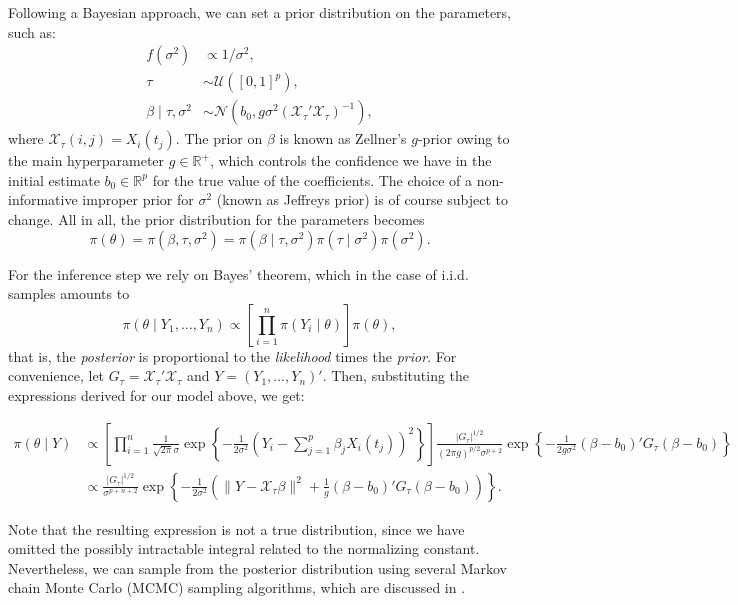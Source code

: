 \documentclass[
  a4paper,
	fontsize=11pt, %
	twoside=false, %
  secnumdepth=2,
	numbers=noenddot, %
]{kaohandt}
\newcommand{\R} {\ensuremath{\mathds{R}}}
\begin{document}
Following a Bayesian approach, we can set a prior distribution on the parameters, such as:
\begin{align*}
  f(\sigma^2)              & \propto 1/\sigma^2,                                                     \\
  \tau                     & \sim \mathscr U([0, 1]^p),                                              \\
  \beta\mid \tau, \sigma^2 & \sim \mathcal N(b_0, g\sigma^2(\mathcal X_\tau' \mathcal X_\tau)^{-1}),
\end{align*}
where
\(\mathcal X_\tau(i, j)=X_i(t_j)\). The prior on \(\beta\) is known as Zellner's \(g\)-prior owing to the main hyperparameter \(g\in \R^+\), which controls the confidence we have in the initial estimate \(b_0 \in \R^p\) for the true value of the coefficients. The choice of a non-informative improper prior for \(\sigma^2\) (known as Jeffreys prior) is of course subject to change. All in all, the prior distribution for the parameters becomes
\begin{equation}
  \label{eq:prior}
  \pi(\theta) = \pi(\beta, \tau, \sigma^2) = \pi(\beta \mid \tau, \sigma^2)\pi(\tau \mid \sigma^2)\pi(\sigma^2).
\end{equation}

For the inference step we rely on Bayes' theorem, which in the case of i.i.d. samples amounts to
\[
  \pi(\theta \mid Y_1, \dots, Y_n) \propto \left[ \prod_{i=1}^n \pi(Y_i\mid \theta) \right]\pi(\theta),
\]
that is, the \textit{posterior} is proportional to the \textit{likelihood} times the \textit{prior}. For convenience, let \(G_\tau=\mathcal X_\tau' \mathcal X_\tau\) and \(Y = (Y_1,\dots, Y_n)'\). Then, substituting the expressions derived for our model above, we get:
\begin{widepar}
  \begin{align*}
    \pi(\theta \mid Y) & \propto \left[ \prod_{i=1}^n  \frac{1}{\sqrt{2\pi}\sigma} \exp\left\{ -\frac{1}{2\sigma^2} \left(Y_i - \sum_{j=1}^{p}\beta_j X_i(t_j)\right)^2 \right\}\right]\frac{|G_\tau|^{1/2}}{(2\pi g)^{p/2}\sigma^{p+2}} \exp\left\{ -\frac{1}{2g\sigma^2} (\beta - b_0)'G_\tau(\beta - b_0)\right\} \\
                       & \propto \frac{|G_\tau|^{1/2}}{\sigma^{p+n+2}} \exp\left\{ -\frac{1}{2\sigma^2} \left(\|Y- \mathcal X_\tau\beta\|^2 + \frac{1}{g}(\beta - b_0)'G_\tau(\beta - b_0) \right) \right\}.
  \end{align*}
\end{widepar}
Note that the resulting expression is not a true distribution, since we have omitted the possibly intractable integral related to the normalizing constant. Nevertheless, we can sample from the posterior distribution using several Markov chain Monte Carlo (MCMC) sampling algorithms, which are discussed in .
\end{document}
